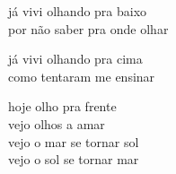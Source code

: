 já vivi olhando pra baixo\\
por não saber pra onde olhar

já vivi olhando pra cima\\
como tentaram me ensinar

hoje olho pra frente\\
vejo olhos a amar\\
vejo o mar se tornar sol\\
vejo o sol se tornar mar
